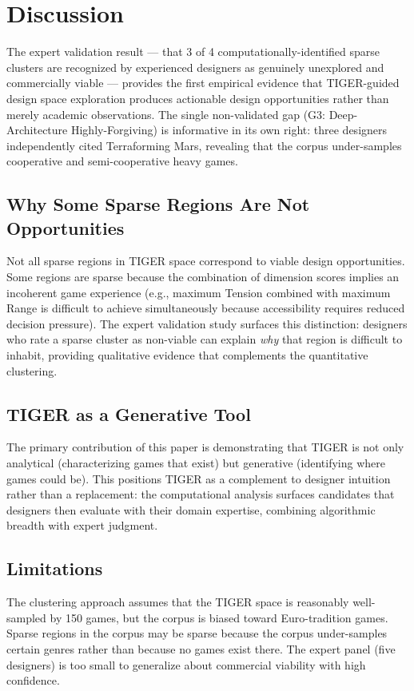 \section{Discussion}
\label{sec:discussion}

The expert validation result --- that 3 of 4 computationally-identified sparse clusters
are recognized by experienced designers as genuinely unexplored and commercially viable ---
provides the first empirical evidence that TIGER-guided design space exploration produces
actionable design opportunities rather than merely academic observations. The single
non-validated gap (G3: Deep-Architecture Highly-Forgiving) is informative in its own
right: three designers independently cited Terraforming Mars, revealing that the corpus
under-samples cooperative and semi-cooperative heavy games.

\subsection{Why Some Sparse Regions Are Not Opportunities}

Not all sparse regions in TIGER space correspond to viable design opportunities. Some
regions are sparse because the combination of dimension scores implies an incoherent
game experience (e.g., maximum Tension combined with maximum Range is difficult to
achieve simultaneously because accessibility requires reduced decision pressure). The
expert validation study surfaces this distinction: designers who rate a sparse cluster
as non-viable can explain \emph{why} that region is difficult to inhabit, providing
qualitative evidence that complements the quantitative clustering.

\subsection{TIGER as a Generative Tool}

The primary contribution of this paper is demonstrating that TIGER is not only
analytical (characterizing games that exist) but generative (identifying where games
could be). This positions TIGER as a complement to designer intuition rather than a
replacement: the computational analysis surfaces candidates that designers then evaluate
with their domain expertise, combining algorithmic breadth with expert judgment.

\subsection{Limitations}

The clustering approach assumes that the TIGER space is reasonably well-sampled by 150
games, but the corpus is biased toward Euro-tradition games. Sparse regions in the
corpus may be sparse because the corpus under-samples certain genres rather than
because no games exist there. The expert panel (five designers) is too small to
generalize about commercial viability with high confidence.
